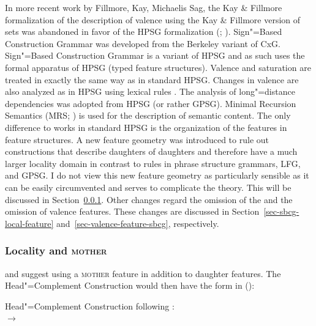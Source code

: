 In more recent work by Fillmore, Kay, Michaelis \biband Sag, the Kay \& Fillmore formalization of the
description of valence using the Kay \& Fillmore version of sets was abandoned in favor of the HPSG formalization
(\citealp{Kay2005a,Michaelis2006a,Sag2012a}; \citealp*[--11]{SBK2012a}).
Sign"=Based Construction Grammar was developed from the Berkeley variant of CxG.
Sign"=Based Construction Grammar is a variant of HPSG \citep[]{Sag2010b} and as such uses the formal apparatus of HPSG (typed feature structures).
Valence and saturation are treated in exactly the same way as in standard HPSG. Changes
in valence are also analyzed as in HPSG using lexical rules \citep*[Section~2.3]{SBK2012a}.
The analysis of long"=distance dependencies was adopted from HPSG (or
rather GPSG\indexgpsg).
Minimal Recursion Semantics (MRS\indexmrs; \citealp*{CFPS2005a}) is used for the description of semantic content.
The only difference to works in standard HPSG is the organization of the features in feature structures.
A new feature geometry was introduced to rule out constructions that describe daughters of
daughters and therefore have a much larger locality domain in contrast to rules in
phrase structure grammars, LFG, and GPSG. I do not view this new feature geometry as particularly
sensible as it can be easily circumvented and serves to complicate the theory. This will be
discussed in Section~\ref{sec-mother}. Other changes regard the omission of the \localf and the
omission of valence features. These changes are discussed in Section~\ref{sec-sbcg-local-feature}
and~\ref{sec-valence-feature-sbcg}, respectively.

\subsubsection{Locality and \textsc{mother}}
\label{sec-mother}

\mbox{}\citet*[475--489]{SWB2003a} and \citet{Sag2007a,Sag2012a} suggest using a \textsc{mother} feature in addition to
daughter features. The Head"=Complement Construction would then have the form in ():

\eas
Head"=Complement Construction following \citet*[481]{SWB2003a}:\\
 $\to$\\
\zs

